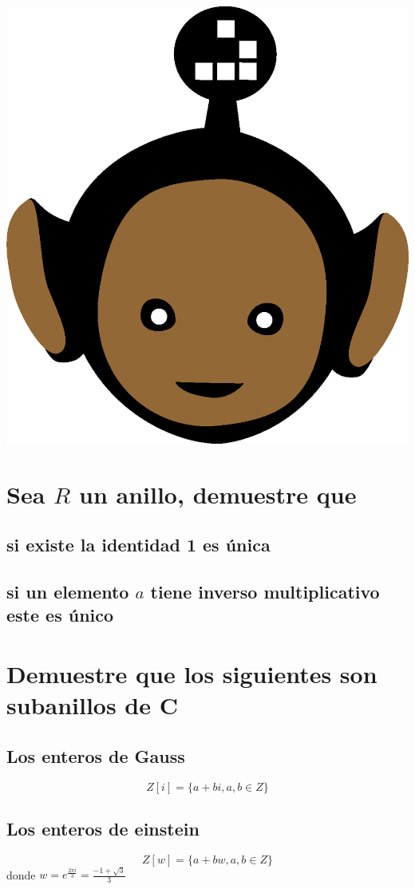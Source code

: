 \documentclass[10pt,a4paper]{article} %
\begin{document}
    \title{\rmfamily\normalfont{}}
    \author{}
    \date{\today}

    \maketitle


    \includegraphics[width=0.1\linewidth]{negro_cara.png}
    \section{Sea $ R  $ un anillo, demuestre que }
        \subsection{si existe la identidad 1 es única}
        \subsection{si un elemento $ a  $ tiene inverso multiplicativo este es
        único}

    \section{Demuestre que los siguientes son subanillos de C}
        \subsection{Los enteros de Gauss}
            \begin{equation}
                Z[i] = \{a + bi ,a,b \in Z \}
            \end{equation}

        \subsection{Los enteros de einstein}
        \begin{equation}
                Z[w] = \{a + bw ,a,b \in Z \}
        \end{equation}
        donde $ w = e ^{ \frac{2 \pi i}{3} } = \frac{-1 + \sqrt{3} }{3}  $
\end{document}
